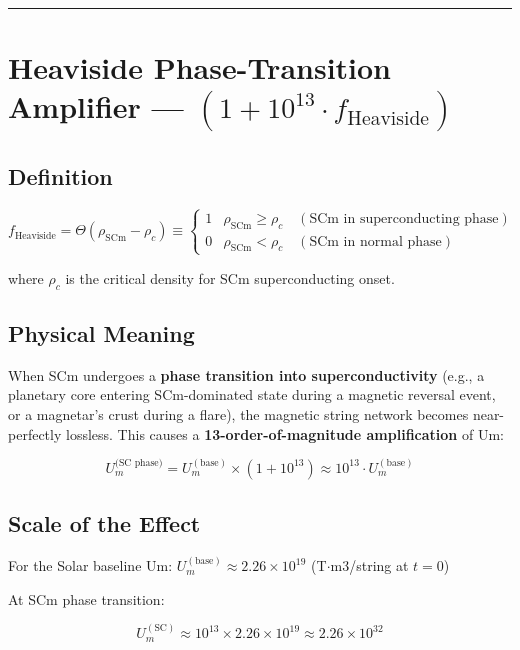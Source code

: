 \documentclass[12pt,a4paper]{article}
\begin{document}
\medskip\hrule\medskip

\section{Heaviside Phase-Transition Amplifier --- $(1 + 10^{13} \cdot f_{\text{Heaviside}})$}

\subsection{Definition}

\begin{equation}
f_{\text{Heaviside}} = \Theta(\rho_{\text{SCm}} - \rho_c) \equiv \begin{cases} 1 & \rho_{\text{SCm}} \geq \rho_c \quad (\text{SCm in superconducting phase}) \\ 0 & \rho_{\text{SCm}} < \rho_c \quad (\text{SCm in normal phase}) \end{cases}
\end{equation}

where $\rho_c$ is the critical density for SCm superconducting onset.

\subsection{Physical Meaning}

When SCm undergoes a \textbf{phase transition into superconductivity} (e.g., a planetary core entering SCm-dominated state during a magnetic reversal event, or a magnetar's crust during a flare), the magnetic string network becomes near-perfectly lossless. This causes a \textbf{13-order-of-magnitude amplification} of Um:

\begin{equation}
U_m^{\text{(SC phase)}} = U_m^{(\text{base})} \times (1 + 10^{13}) \approx 10^{13} \cdot U_m^{(\text{base})}
\end{equation}

\subsection{Scale of the Effect}

For the Solar baseline Um: $U_m^{(\text{base})} \approx 2.26 \times 10^{19}$ (T$\cdot$m3/string at $t=0$)

At SCm phase transition:

\begin{equation}
U_m^{(\text{SC})} \approx 10^{13} \times 2.26 \times 10^{19} \approx 2.26 \times 10^{32}
\end{equation}
\end{document}
